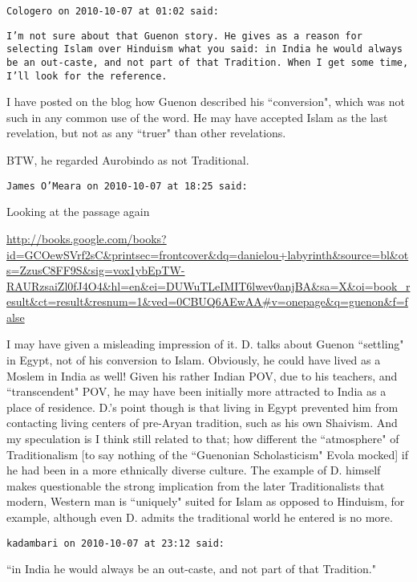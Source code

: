 \begin{footnotesize}
\begin{sffamily}
\hfill

\texttt{Cologero on 2010-10-07 at 01:02 said: }

\texttt{I'm not sure about that Guenon story. He gives as a reason for selecting Islam over Hinduism what you said: in India he would always be an out-caste, and not part of that Tradition. When I get some time, I'll look for the reference.}

I have posted on the blog how Guenon described his ``conversion", which was not such in any common use of the word. He may have accepted Islam as the last revelation, but not as any ``truer" than other revelations.

BTW, he regarded Aurobindo as not Traditional.


\hfill

\texttt{James O'Meara on 2010-10-07 at 18:25 said: }

Looking at the passage again

\url{http://books.google.com/books?id=GCOewSVrf2sC\&printsec=frontcover\&dq=danielou+labyrinth\&source=bl\&ots=ZzusC8FF9S\&sig=vox1ybEpTW-RAURzsaiZl0fJ4O4\&hl=en\&ei=DUWuTLeIMIT6lwev0anjBA\&sa=X\&oi=book\_result\&ct=result\&resnum=1\&ved=0CBUQ6AEwAA\#v=onepage\&q=guenon\&f=false}

I may have given a misleading impression of it. D. talks about Guenon ``settling" in Egypt, not of his conversion to Islam. Obviously, he could have lived as a Moslem in India as well! Given his rather Indian POV, due to his teachers, and ``transcendent" POV, he may have been initially more attracted to India as a place of residence. D.'s point though is that living in Egypt prevented him from contacting living centers of pre-Aryan tradition, such as his own Shaivism. And my speculation is I think still related to that; how different the ``atmosphere" of Traditionalism [to say nothing of the ``Guenonian Scholasticism" Evola mocked] if he had been in a more ethnically diverse culture. The example of D. himself makes questionable the strong implication from the later Traditionalists that modern, Western man is ``uniquely" suited for Islam as opposed to Hinduism, for example, although even D. admits the traditional world he entered is no more.


\hfill

\texttt{kadambari on 2010-10-07 at 23:12 said: }

``in India he would always be an out-caste, and not part of that Tradition."


\end{sffamily}
\end{footnotesize}
